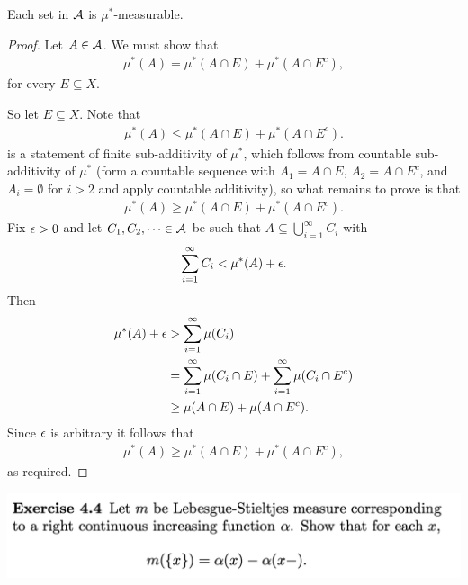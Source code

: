 \begin{claim*}
  Each set in $\mathcal A$ is $\mu^*$-measurable.
\end{claim*}

\begin{proof}
  Let $A \in \mathcal A$. We must show that
  \begin{align*}
    \mu^*(A) = \mu^*(A \cap E) + \mu^*(A \cap E^c),
  \end{align*}
  for every $E \subseteq X$.

  So let $E \subseteq X$. Note that
  \begin{align*}
    \mu^*(A) \leq \mu^*(A \cap E) + \mu^*(A \cap E^c).
  \end{align*}
  is a statement of finite sub-additivity of $\mu^*$, which follows from countable sub-additivity of $\mu^*$
  (form a countable sequence with $A_1 = A \cap E$, $A_2 = A \cap E^c$, and $A_i = \emptyset$ for $i > 2$ and
  apply countable additivity), so what remains to prove is that
  \begin{align*}
    \mu^*(A) \geq \mu^*(A \cap E) + \mu^*(A \cap E^c).
  \end{align*}
  Fix $\epsilon > 0$ and let $C_{1}, C_{2}, \dots \in \mathcal A$ be such that $A \subseteq \bigcup_{i=1}^\infty C_{i}$ with
  \begin{align*}
    \sum_{i=1}^\infty C_i < \mu^*(A) + \epsilon.
  \end{align*}
  Then
  \begin{align*}
    \mu^*(A) + \epsilon
    &> \sum_{i=1}^\infty \mu(C_i) \\
    &= \sum_{i=1}^\infty \mu(C_i \cap E) + \sum_{i=1}^\infty \mu(C_i \cap E^c) \\
    &\geq \mu(A \cap E) + \mu(A \cap E^c).
  \end{align*}
  Since $\epsilon$ is arbitrary it follows that
  \begin{align*}
    \mu^*(A) \geq \mu^*(A \cap E) + \mu^*(A \cap E^c),
  \end{align*}
  as required.
\end{proof}

\newpage
\begin{mdframed}
\includegraphics[width=400pt]{img/analysis--berkeley-202a-hw04-c0b6.png}
\end{mdframed}





























